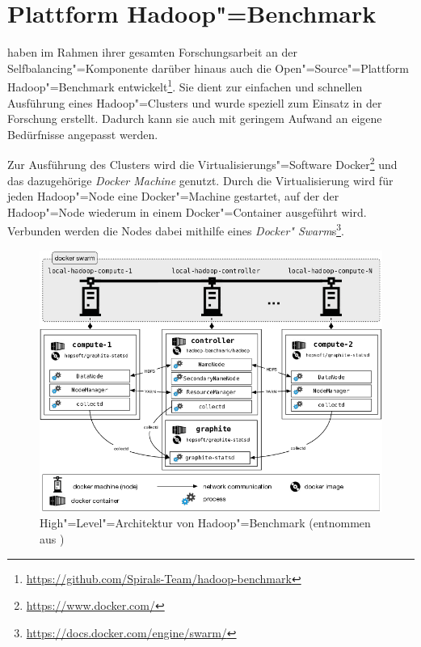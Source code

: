 \section{Plattform Hadoop"=Benchmark}
\label{sec:hadoopBenchmark}

\citeauthor{Zhang2016} haben im Rahmen ihrer gesamten Forschungsarbeit an der Selfbalancing"=Komponente darüber hinaus auch die Open"=Source"=Plattform Hadoop"=Benchmark entwickelt\footnote{\url{https://github.com/Spirals-Team/hadoop-benchmark}}.
Sie dient zur einfachen und schnellen Ausführung eines Hadoop"=Clusters und wurde speziell zum Einsatz in der Forschung erstellt.
Dadurch kann sie auch mit geringem Aufwand an eigene Bedürfnisse angepasst werden.

Zur Ausführung des Clusters wird die Virtualisierungs"=Software Docker\footnote{\url{https://www.docker.com/}} und das dazugehörige \emph{Docker Machine} genutzt.
Durch die Virtualisierung wird für jeden Hadoop"=Node eine Docker"=Machine gestartet, auf der der Hadoop"=Node wiederum in einem Docker"=Container ausgeführt wird.
Verbunden werden die Nodes dabei mithilfe eines \emph{Docker" Swarm}s\footnote{\url{https://docs.docker.com/engine/swarm/}}.

\begin{figure}[h]
    \includegraphics{./resources/hadoopBenchmarkArch.png}
    \caption[High"=Level"=Architektur von Hadoop"=Benchmark]
    {High"=Level"=Architektur von Hadoop"=Benchmark (entnommen aus \cite{abb:hadoopBenchmarkArch})}
    \label{fig:hadoopBenchmarkArchitecture}
\end{figure}

